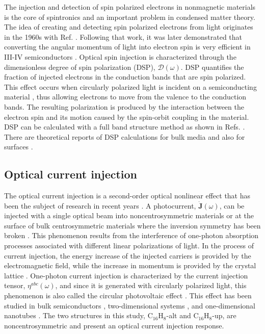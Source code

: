 \documentclass[pss]{wiley2sp} %
\begin{document}
The injection and detection of spin polarized electrons in nonmagnetic
materials is the core of spintronics \cite{vzuticRMP04,fertRMP08} and an
important problem in condensed matter theory. The idea of creating and
detecting spin polarized electrons from light originates in the 1960s with
Ref. \cite{lampelPRL68}. Following that work, it was later demonstrated that
converting the angular momentum of light into electron spin is very efficient
in III-IV semiconductors \cite{dyakonovOO84}. Optical spin injection is
characterized through the dimensionless degree of spin polarization (DSP),
$\boldsymbol{\mathcal{D}}(\omega)$. DSP quantifies the fraction of
injected electrons in the conduction bands that are spin polarized. This
effect occurs when circularly polarized light is incident on a semiconducting
material \cite{dyakonovOO84}, thus allowing electrons to move from the valence
to the conduction bands. The resulting polarization is produced by the
interaction between the electron spin and its motion caused by the spin-orbit
coupling in the material. DSP can be calculated with a full band structure
method as shown in Refs. \cite{nastosPRB07,cabellosPRB09}. There are
theoretical reports of DSP calculations for bulk media
\cite{nastosPRB07,cabellosPRB09} and also for surfaces
\cite{mendozaPRB12,arzatePRB14}.


\subsection{Optical current injection}

The optical current injection is a second-order optical nonlinear effect that
has been the subject of research in recent years
\cite{arzatePRB14,bhatPRB05,fraserPRL99,hachePRL97,lamanAPL99}. A
photocurrent, $\mathbf{\dot{J}}(\omega)$, can be injected with a single
optical beam into noncentrosymmetric materials or at the surface of bulk
centrosymmetric materials where the inversion symmetry has been broken
\cite{arzatePRB14}. This phenomenon results from the interference of one-photon 
absorption processes associated with different linear polarizations of
light. In the process of current injection, the energy increase of the
injected carriers is provided by the electromagnetic field, while the
increase in momentum is provided by the crystal lattice \cite{arzatePRB14}.
One-photon current injection is characterized by the current injection
tensor, $\eta^{abc}(\omega)$, and since it is generated with circularly
polarized light, this phenomenon is also called the circular photovoltaic
effect \cite{sturmanCRCP92}. This effect has been studied in bulk
semiconductors \cite{hachePRL97,sipePRB00}, two-dimensional systems
\cite{melePRB00,cabellosPRB11}, and one-dimensional nanotubes
\cite{melePRB00}. The two structures in this study, C$_{16}$H$_{8}$-alt and
C$_{16}$H$_{8}$-up, are noncentrosymmetric and present an optical current
injection response.
\end{document}
